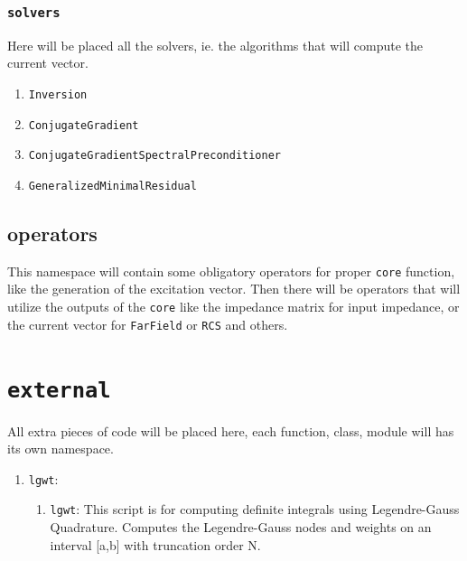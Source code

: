 \documentclass[9pt]{article}
\begin{document}
    \subsubsection{\texttt{solvers}}

    Here will be placed all the solvers, ie. the algorithms that will compute the current vector.

    \begin{enumerate}[label=\Roman*.]
        \item \texttt{Inversion}
        \item \texttt{ConjugateGradient}
        \item \texttt{ConjugateGradientSpectralPreconditioner}
        \item \texttt{GeneralizedMinimalResidual}
    \end{enumerate}

    \subsection{operators}

    This namespace will contain some obligatory operators for proper \texttt{core} function, like the generation of the excitation vector. Then there will be operators that will utilize the outputs of the \texttt{core} like the impedance matrix for input impedance, or the current vector for \texttt{FarField} or \texttt{RCS} and others.

     \section{\texttt{external}}

    All extra pieces of code will be placed here, each function, class, module will has its own namespace.

    \begin{enumerate}[label=\Roman*.]
        \item \texttt{lgwt}:
        \begin{enumerate}[label=\roman*.]
            \item \texttt{lgwt}: This script is for computing definite integrals using Legendre-Gauss Quadrature. Computes the Legendre-Gauss nodes and weights on an interval [a,b] with truncation order N.
        \end{enumerate}
    \end{enumerate}
\end{document}
